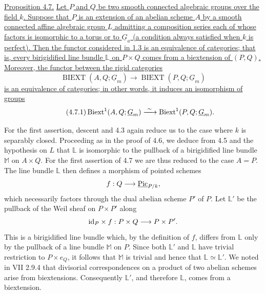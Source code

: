 
\medskip
\noindent\underline{Proposition 4.7.}  \underline{Let $P$ and $Q$
be two smooth connected algebraic groups over the field $k$.
Suppose that $P$ is an extension of an abelian scheme $A$ by a smooth
connected affine algebraic group $L$ admitting a composition series
each of whose factors is isomorphic to a torus or to $\underline
G_a$ (a condition always satisfied when $k$ is perfect).  Then the
functor considered in 1.3 is an equivalence of categories; that is,
every birigidified line bundle $\mathbb L$ on $P\times Q$ comes from
a biextension of $(P,Q)$.  Moreover, the functor between the rigid
categories}
\[
 \operatorname{BIEXT}(A,Q;\underline G_m)
 \longrightarrow
 \operatorname{BIEXT}(P,Q;\underline G_m)
\]
\underline{is an equivalence of categories; in other words, it
induces an isomorphism of groups}
\begin{equation}\tag{4.7.1}
 \Biext^1(A,Q;\underline G_m)
 \xrightarrow{\ \sim\ }
 \Biext^1(P,Q;\underline G_m).
\end{equation}

For the first assertion, descent and 4.3 again reduce us to the case
where $k$ is separably closed.  Proceeding as in the proof of 4.6,
we deduce from 4.5 and the hypothesis on $L$ that $\mathbb L$ is
isomorphic to the pullback of a birigidified line bundle $\mathbb M$
on $A\times Q$.  For the first assertion of 4.7 we are thus reduced
to the case $A=P$.  The line bundle $\mathbb L$ then defines a
morphism of pointed schemes
\[
 f:Q\longrightarrow\underline{\Pic}_{P/k},
\]
which necessarily factors through the dual abelian scheme $P'$ of
$P$.  Let $\mathbb L'$ be the pullback of the Weil sheaf on
$P\times P'$ along
\[
 \mathrm{id}_P\times f:P\times Q\longrightarrow P\times P'.
\]
This is a birigidified line bundle which, by the definition of $f$,
differs from $\mathbb L$ only by the pullback of a line bundle
$\mathbb M$ on $P$.  Since both $\mathbb L'$ and $\mathbb L$ have
trivial restriction to $P\times e_Q$, it follows that $\mathbb M$ is
trivial and hence that $\mathbb L\simeq\mathbb L'$.  We noted in VII
2.9.4 that divisorial correspondences on a product of two abelian
schemes arise from biextensions.  Consequently $\mathbb L'$, and
therefore $\mathbb L$, comes from a biextension.

